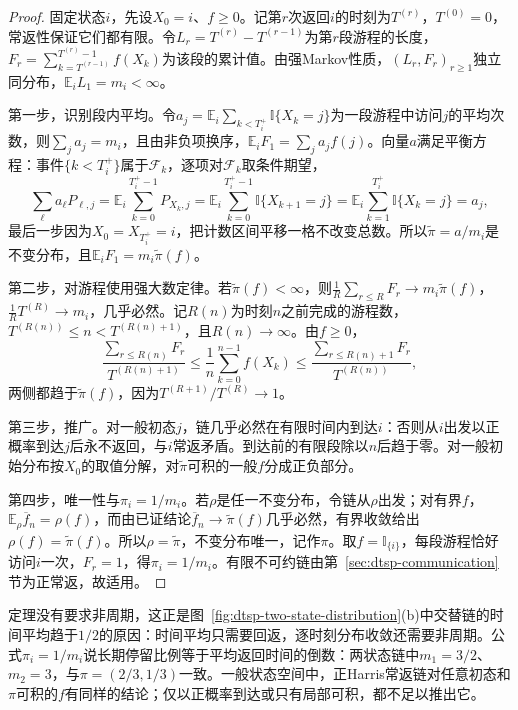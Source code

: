 \begin{proof}
固定状态$i$，先设$X_0=i$、$f\geq0$。记第$r$次返回$i$的时刻为$T^{(r)}$，$T^{(0)}=0$，常返性保证它们都有限。令$L_r=T^{(r)}-T^{(r-1)}$为第$r$段游程的长度，$F_r=\sum_{k=T^{(r-1)}}^{T^{(r)}-1}f(X_k)$为该段的累计值。由强Markov性质，$(L_r,F_r)_{r\geq1}$独立同分布，$\mathbb E_iL_1=m_i<\infty$。

第一步，识别段内平均。令$a_j=\mathbb E_i\sum_{k<T_i^{+}}\mathbb I\{X_k=j\}$为一段游程中访问$j$的平均次数，则$\sum_ja_j=m_i$，且由非负项换序，$\mathbb E_iF_1=\sum_ja_jf(j)$。向量$a$满足平衡方程：事件$\{k<T_i^+\}$属于$\mathcal F_k$，逐项对$\mathcal F_k$取条件期望，
\[
  \sum_\ell a_\ell P_{\ell,j}=\mathbb E_i\sum_{k=0}^{T_i^+-1}P_{X_k,j}=\mathbb E_i\sum_{k=0}^{T_i^+-1}\mathbb I\{X_{k+1}=j\}=\mathbb E_i\sum_{k=1}^{T_i^+}\mathbb I\{X_k=j\}=a_j,
\]
最后一步因为$X_0=X_{T_i^+}=i$，把计数区间平移一格不改变总数。所以$\tilde\pi=a/m_i$是不变分布，且$\mathbb E_iF_1=m_i\tilde\pi(f)$。

第二步，对游程使用强大数定律。若$\tilde\pi(f)<\infty$，则$\frac1R\sum_{r\leq R}F_r\to m_i\tilde\pi(f)$，$\frac1RT^{(R)}\to m_i$，几乎必然。记$R(n)$为时刻$n$之前完成的游程数，$T^{(R(n))}\leq n<T^{(R(n)+1)}$，且$R(n)\to\infty$。由$f\geq0$，
\[
  \frac{\sum_{r\leq R(n)}F_r}{T^{(R(n)+1)}}\leq\frac1n\sum_{k=0}^{n-1}f(X_k)\leq\frac{\sum_{r\leq R(n)+1}F_r}{T^{(R(n))}},
\]
两侧都趋于$\tilde\pi(f)$，因为$T^{(R+1)}/T^{(R)}\to1$。

第三步，推广。对一般初态$j$，链几乎必然在有限时间内到达$i$：否则从$i$出发以正概率到达$j$后永不返回，与$i$常返矛盾。到达前的有限段除以$n$后趋于零。对一般初始分布按$X_0$的取值分解，对$\tilde\pi$可积的一般$f$分成正负部分。

第四步，唯一性与$\pi_i=1/m_i$。若$\rho$是任一不变分布，令链从$\rho$出发；对有界$f$，$\mathbb E_\rho\overline f_n=\rho(f)$，而由已证结论$\overline f_n\to\tilde\pi(f)$几乎必然，有界收敛给出$\rho(f)=\tilde\pi(f)$。所以$\rho=\tilde\pi$，不变分布唯一，记作$\pi$。取$f=\mathbb I_{\{i\}}$，每段游程恰好访问$i$一次，$F_r=1$，得$\pi_i=1/m_i$。有限不可约链由第~\ref{sec:dtsp-communication}节为正常返，故适用。
\end{proof}

定理没有要求非周期，这正是图~\ref{fig:dtsp-two-state-distribution}(b)中交替链的时间平均趋于$1/2$的原因：时间平均只需要回返，逐时刻分布收敛还需要非周期。公式$\pi_i=1/m_i$说长期停留比例等于平均返回时间的倒数：两状态链中$m_1=3/2$、$m_2=3$，与$\pi=(2/3,1/3)$一致。一般状态空间中，正Harris常返链对任意初态和$\pi$可积的$f$有同样的结论；仅以正概率到达或只有局部可积，都不足以推出它。

